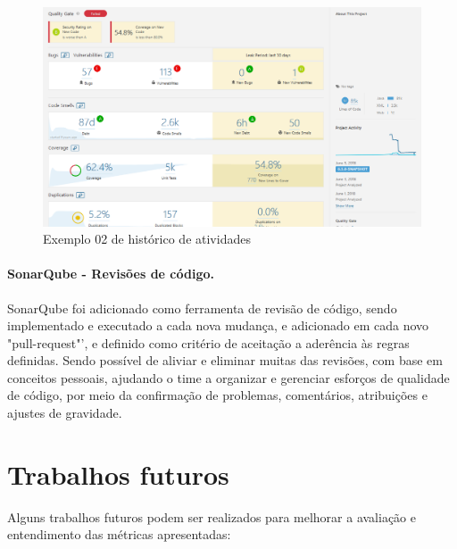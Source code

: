 \documentclass[12pt]{article}
\begin{document}
\begin{figure}[H]
	\centering
		\includegraphics[scale=0.5]{img/sonar-overview-PMD.png}
	\caption{Exemplo 02 de histórico de atividades}
	\label{fig:sonar-overview-PMD}
\end{figure}



\subsection{SonarQube - Revisões de código.} \label{sec:sonar-review}

SonarQube foi adicionado como ferramenta de revisão de código, sendo implementado e executado a cada nova mudança, e adicionado em cada novo "pull-request"', e definido como critério de aceitação a aderência às regras definidas.
Sendo possível de aliviar e eliminar muitas das revisões, com base em conceitos pessoais, ajudando o time a organizar e gerenciar esforços de qualidade de código, por meio da confirmação de problemas, comentários, atribuições e ajustes de gravidade.

\newpage
\part{Trabalhos futuros} \label{sec:trabalhos_futuros}

Alguns trabalhos futuros podem ser realizados para melhorar a avaliação e entendimento das métricas apresentadas:
\end{document}
